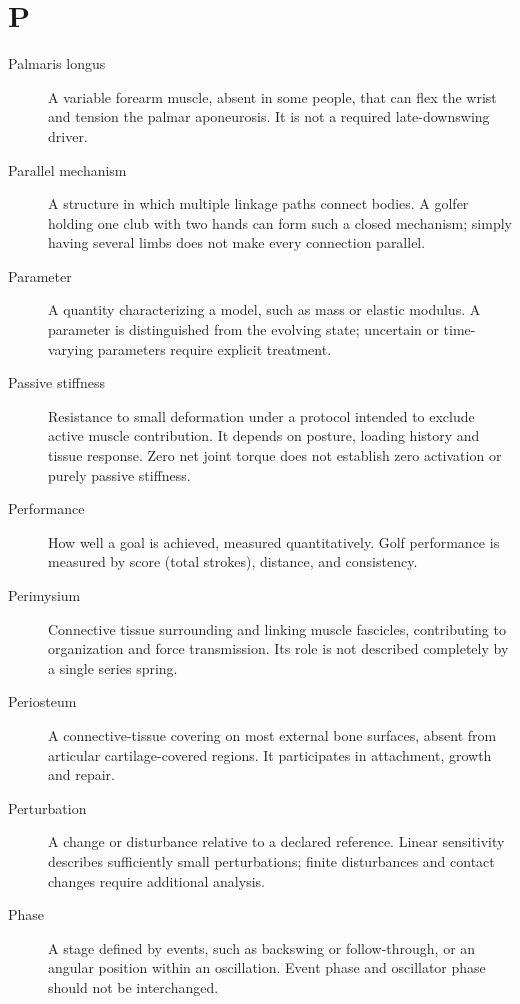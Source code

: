\section*{P}
\begin{description}

\item[Palmaris longus] A variable forearm muscle, absent in some people, that can flex the wrist and tension the palmar aponeurosis. It is not a required late-downswing driver.

\item[Parallel mechanism] A structure in which multiple linkage paths connect bodies. A golfer holding one club with two hands can form such a closed mechanism; simply having several limbs does not make every connection parallel.

\item[Parameter] A quantity characterizing a model, such as mass or elastic modulus. A parameter is distinguished from the evolving state; uncertain or time-varying parameters require explicit treatment.

\item[Passive stiffness] Resistance to small deformation under a protocol intended to exclude active muscle contribution. It depends on posture, loading history and tissue response. Zero net joint torque does not establish zero activation or purely passive stiffness.

\item[Performance] How well a goal is achieved, measured quantitatively. Golf performance is measured by score (total strokes), distance, and consistency.

\item[Perimysium] Connective tissue surrounding and linking muscle fascicles, contributing to organization and force transmission. Its role is not described completely by a single series spring.

\item[Periosteum] A connective-tissue covering on most external bone surfaces, absent from articular cartilage-covered regions. It participates in attachment, growth and repair.

\item[Perturbation] A change or disturbance relative to a declared reference. Linear sensitivity describes sufficiently small perturbations; finite disturbances and contact changes require additional analysis.

\item[Phase] A stage defined by events, such as backswing or follow-through, or an angular position within an oscillation. Event phase and oscillator phase should not be interchanged.


\end{description}
